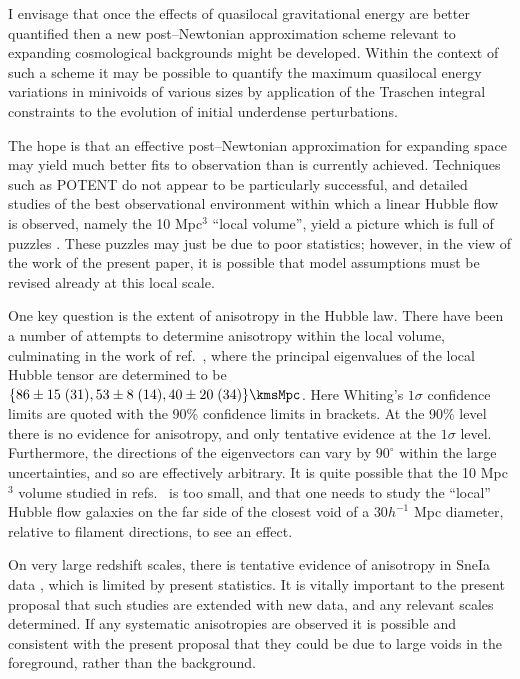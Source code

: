 \documentclass[12pt]{iopart}
\begin{document}
I envisage that once the effects of quasilocal gravitational energy are
better quantified then a new post--Newtonian approximation scheme relevant
to expanding cosmological backgrounds might be developed. Within the context
of such a scheme it may be possible to quantify the maximum quasilocal
energy variations in minivoids of various sizes by application of the
Traschen integral constraints \cite{Traschen1} to the evolution of initial
underdense perturbations.

The hope is that an effective post--Newtonian approximation for expanding
space may yield much better fits to observation than is currently achieved.
Techniques such as POTENT do not appear to be particularly successful, and
detailed studies of the best observational environment within which a
linear Hubble flow is observed, namely the 10 Mpc$^3$ ``local volume'',
yield a picture which is full of puzzles \cite{Whiting1,Whiting2}. These
puzzles may just be due to poor statistics; however, in the view of the
work of the present paper, it is possible that model assumptions must
be revised already at this local scale.

One key question is the extent of anisotropy in the Hubble law.
There have been a number of attempts to determine anisotropy within the
local volume, culminating in the work of ref.\ \cite{Whiting2}, where the
principal eigenvalues of the local Hubble tensor are determined to be
$\{86\pm15\;(31),53\pm8\;(14),40\pm20\; (34)\}\kmsMpc$. Here Whiting's
$1\sigma$ confidence limits are quoted with the 90\% confidence limits in
brackets. At the 90\% level there is no evidence for anisotropy, and only
tentative evidence at the $1\sigma$ level. Furthermore, the directions of the
eigenvectors can vary by $90^\circ$ within the large uncertainties, and
so are effectively arbitrary. It is quite possible that the 10 Mpc$^3$
volume studied in refs.\ \cite{Whiting1,Whiting2} is too small, and that
one needs to study the ``local'' Hubble flow galaxies on the far side of
the closest void of a $30h^{-1}$ Mpc diameter, relative to filament
directions, to see an effect.

On very large redshift scales, there is tentative evidence of anisotropy
in SneIa data \cite{Bochner}, which is limited by present statistics.
It is vitally important to the present proposal that such studies are
extended with new data, and any relevant scales determined. If any
systematic anisotropies are observed it is possible and consistent
with the present proposal that they could be due to large voids
in the foreground, rather than the background.
\end{document}
